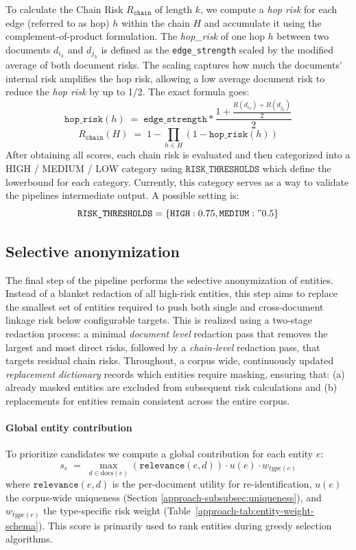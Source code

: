 To calculate the Chain Risk $R_{\texttt{chain}}$ of length $k$, we compute a \emph{hop risk} for each edge (referred to as hop) $h$ within the chain $H$ and accumulate it using the complement-of-product formulation. The \textit{hop\_risk} of one hop $h$ between two documents $d_{i_h}$ and $d_{j_h}$ is defined as the \texttt{edge\_strength} scaled by the modified average of both document risks. The scaling captures how much the documents' internal risk amplifies the hop risk, allowing a low average document risk to reduce the \emph{hop risk} by up to 1/2. The exact formula goes:
\[
\texttt{hop\_risk}(h)\;=\; \texttt{edge\_strength} * \frac{1+\frac{R(d_{i_h}) + R(d_{j_h})}{2}}{2}
\]
\[
R_{\texttt{chain}}(H) \;=\; 1 - \prod_{h\in H} (1 - \texttt{hop\_risk}(h))
\]
After obtaining all scores, each chain risk is evaluated and then categorized into a HIGH / MEDIUM / LOW category using $\texttt{RISK\_THRESHOLDS}$ which define the lowerbound for each category. Currently, this category serves as a way to validate the pipelines intermediate output. A possible setting is:
\[
\texttt{RISK\_THRESHOLDS} = \{\texttt{HIGH}: 0.75, \texttt{MEDIUM}:" 0.5\}
\]

\subsection{Selective anonymization}
The final step of the pipeline performs the selective anonymization of entities. Instead of a blanket redaction of all high-risk entities, this step aims to replace the smallest set of entities required to push both single and cross-document linkage risk below configurable targets. This is realized using a two-stage redaction process: a minimal \textit{document level} redaction pass that removes the largest and most direct risks, followed by a \textit{chain-level} redaction pass, that targets residual chain risks. Throughout, a corpus wide, continuously updated \textit{replacement dictionary} records which entities require masking, ensuring that: (a) already masked entities are excluded from subsequent risk calculations and (b) replacements for entities remain consistent across the entire corpus.


\paragraph{Global entity contribution} 
To prioritize candidates we compute a global contribution for each entity \(e\):
\[
s_e \;=\; \max_{d\in\mathrm{docs}(e)} (\texttt{relevance}(e,d)) \cdot u(e) \cdot w_{type(e)}
\]
where $\texttt{relevance}(e,d)$ is the per-document utility for re-identification, $u(e)$ the corpus-wide uniqueness (Section \ref{approach-subsubsec:uniqueness}), and $w_{type(e)}$ the type-specific risk weight (Table~\ref{approach-tab:entity-weight-schema}). This score is primarily used to rank entities during greedy selection algorithms.

